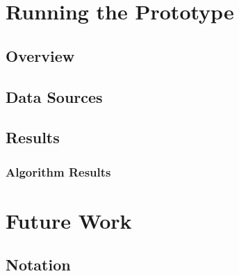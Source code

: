 \documentclass[mnsc,nonblindrev]{informs3} %
\begin{document}
\section{Running the Prototype}

\subsection{Overview}



\subsection{Data Sources}



\subsection{Results}

\subsubsection{Algorithm Results}



\section{Future Work}




%
%
%
\begin{APPENDICES}
\section{Notation}




%  

%  

\end{APPENDICES}
\end{document}
